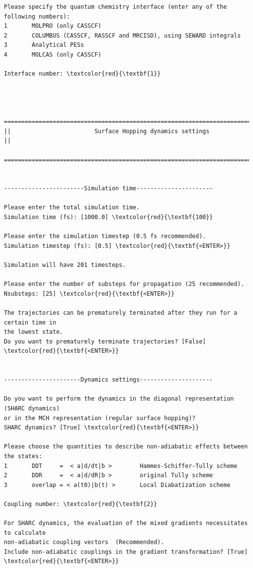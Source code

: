\documentclass[a4paper,11pt,DIV=15,openany]{scrbook}
\begin{document}
\begin{oframed}
\begin{Verbatim}[commandchars=\\\{\}]
Please specify the quantum chemistry interface (enter any of the following numbers):
1       MOLPRO (only CASSCF)
2       COLUMBUS (CASSCF, RASSCF and MRCISD), using SEWARD integrals
3       Analytical PESs
4       MOLCAS (only CASSCF)

Interface number: \textcolor{red}{\textbf{1}}



  ================================================================================
||                        Surface Hopping dynamics settings                       ||
  ================================================================================


-----------------------Simulation time----------------------

Please enter the total simulation time.
Simulation time (fs): [1000.0] \textcolor{red}{\textbf{100}}

Please enter the simulation timestep (0.5 fs recommended).
Simulation timestep (fs): [0.5] \textcolor{red}{\textbf{<ENTER>}}

Simulation will have 201 timesteps.

Please enter the number of substeps for propagation (25 recommended).
Nsubsteps: [25] \textcolor{red}{\textbf{<ENTER>}}

The trajectories can be prematurely terminated after they run for a certain time in 
the lowest state. 
Do you want to prematurely terminate trajectories? [False] \textcolor{red}{\textbf{<ENTER>}}


----------------------Dynamics settings---------------------

Do you want to perform the dynamics in the diagonal representation (SHARC dynamics) 
or in the MCH representation (regular surface hopping)?
SHARC dynamics? [True] \textcolor{red}{\textbf{<ENTER>}}

Please choose the quantities to describe non-adiabatic effects between the states:
1       DDT     =  < a|d/dt|b >        Hammes-Schiffer-Tully scheme   
2       DDR     =  < a|d/dR|b >        original Tully scheme          
3       overlap = < a(t0)|b(t) >       Local Diabatization scheme     

Coupling number: \textcolor{red}{\textbf{2}}

For SHARC dynamics, the evaluation of the mixed gradients necessitates to calculate 
non-adiabatic coupling vectors  (Recommended).
Include non-adiabatic couplings in the gradient transformation? [True]  \textcolor{red}{\textbf{<ENTER>}}


\end{Verbatim}
\end{oframed}
\end{document}
